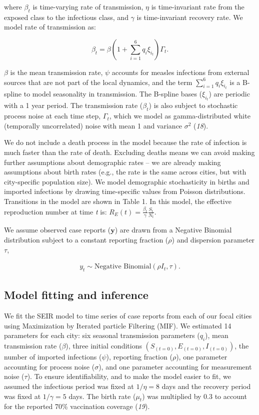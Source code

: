 \documentclass[3p]{elsarticle} %
\begin{document}
\noindent{}where \(\beta_t\) is time-varying rate of transmission,
\(\eta\) is time-invariant rate from the exposed class to the infectious
class, and \(\gamma\) is time-invariant recovery rate. We model rate of
transmission as:

\begin{equation}
\beta_t = \beta \left(1 + \sum^6_{i=1} q_i \xi_{i_{t}} \right) \Gamma_t.
\end{equation}

\(\beta\) is the mean transmission rate, \(\psi\) accounts for measles
infections from external sources that are not part of the local
dynamics, and the term \(\sum^6_{i=1} q_i \xi_{i_{t}}\) is a B-spline to
model seasonality in transmission. The B-spline bases (\(\xi_{i_{t}}\))
are periodic with a 1 year period. The transmission rate (\(\beta_t\))
is also subject to stochastic process noise at each time step,
\(\Gamma_t\), which we model as gamma-distributed white (temporally
uncorrelated) noise with mean 1 and variance \(\sigma^2\) (\emph{18}).

We do not include a death process in the model because the rate of
infection is much faster than the rate of death. Excluding deaths means
we can avoid making further assumptions about demographic rates -- we
are already making assumptions about birth rates (e.g., the rate is the
same across cities, but with city-specific population size). We model
demographic stochasticity in births and imported infections by drawing
time-specific values from Poisson distributions. Transitions in the
model are shown in Table 1. In this model, the effective reproduction
number at time \emph{t} is:
\(R_E(t) = \frac{\beta_t}{\gamma} \frac{S_t}{N_t}\).

We assume observed case reports (\(\textbf{y}\)) are drawn from a
Negative Binomial distribution subject to a constant reporting fraction
(\(\rho\)) and dispersion parameter \(\tau\),

\begin{align}
y_t \sim \text{Negative Binomial} \left( \rho I_t, \tau \right).
\end{align}

\subsection{Model fitting and
inference}\label{model-fitting-and-inference}

We fit the SEIR model to time series of case reports from each of our
focal cities using Maximization by Iterated particle Filtering (MIF). We
estimated 14 parameters for each city: six seasonal transmission
parameters (\(q_i\)), mean transmission rate (\(\beta\)), three initial
conditions \(\left(S_{(t=0)},E_{(t=0)},I_{(t=0)}\right)\), the number of
imported infections (\(\psi\)), reporting fraction (\(\rho\)), one
parameter accounting for process noise (\(\sigma\)), and one parameter
accounting for measurement noise (\(\tau\)). To ensure identifiability,
and to make the model easier to fit, we assumed the infectious period
was fixed at \(1/\eta = 8\) days and the recovery period was fixed at
\(1/\gamma = 5\) days. The birth rate (\(\mu_t\)) was multiplied by 0.3
to account for the reported 70\% vaccination coverage (\emph{19}).
\end{document}
